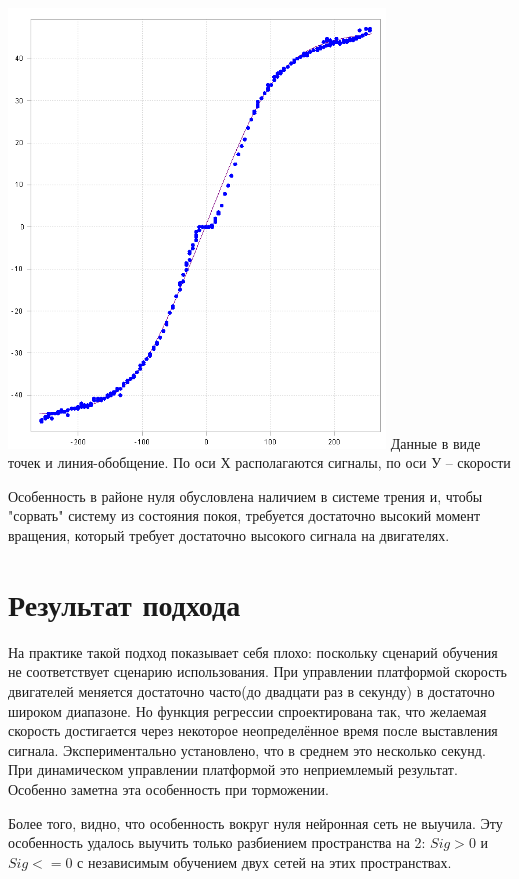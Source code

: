\documentclass[14pt]{extreport}
\begin{document}
                \begin{center}
                        \includegraphics[width=0.75\textwidth]{Neuro}
                        \small Данные в виде точек и линия-обобщение. По оси Х располагаются сигналы, по оси У -- скорости
                \end{center}
                
                Особенность в районе нуля обусловлена наличием в системе трения и, чтобы "сорвать" систему из состояния покоя, требуется достаточно высокий момент вращения, который требует достаточно высокого сигнала на двигателях.
            \section{Результат подхода}

                На практике такой подход показывает себя плохо: поскольку сценарий обучения не соответствует сценарию использования. При управлении платформой скорость двигателей меняется достаточно часто(до двадцати раз в секунду) в достаточно широком диапазоне. Но функция регрессии спроектирована так, что желаемая скорость достигается через некоторое неопределённое время после выставления сигнала. Экспериментально установлено, что в среднем это несколько секунд. При динамическом управлении платформой это неприемлемый результат. Особенно заметна эта особенность при торможении.

                Более того, видно, что особенность вокруг нуля нейронная сеть не выучила. Эту особенность удалось выучить только разбиением пространства на 2: $Sig>0$ и $Sig<=0$ с независимым обучением двух сетей на этих пространствах.
\end{document}
